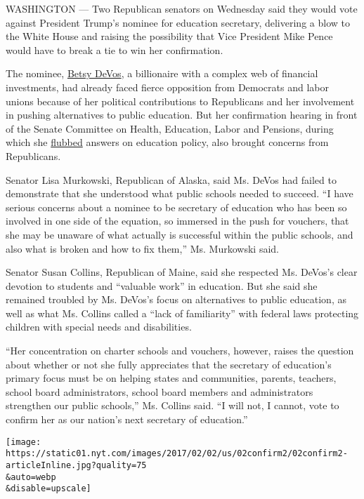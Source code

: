 WASHINGTON --- Two Republican senators on Wednesday said they would vote
against President Trump's nominee for education secretary, delivering a
blow to the White House and raising the possibility that Vice President
Mike Pence would have to break a tie to win her confirmation.

The nominee,
\href{https://www.nytimes.com/2017/01/18/us/politics/betsy-devos-education-secretary-confirmation-donald-trump.html}{Betsy
DeVos}, a billionaire with a complex web of financial investments, had
already faced fierce opposition from Democrats and labor unions because
of her political contributions to Republicans and her involvement in
pushing alternatives to public education. But her confirmation hearing
in front of the Senate Committee on Health, Education, Labor and
Pensions, during which she
\href{https://www.nytimes.com/2017/01/18/us/politics/betsy-devos-education-secretary-confirmation-donald-trump.html?_r=0}{flubbed}
answers on education policy, also brought concerns from Republicans.

Senator Lisa Murkowski, Republican of Alaska, said Ms. DeVos had failed
to demonstrate that she understood what public schools needed to
succeed. ``I have serious concerns about a nominee to be secretary of
education who has been so involved in one side of the equation, so
immersed in the push for vouchers, that she may be unaware of what
actually is successful within the public schools, and also what is
broken and how to fix them,'' Ms. Murkowski said.

Senator Susan Collins, Republican of Maine, said she respected Ms.
DeVos's clear devotion to students and ``valuable work'' in education.
But she said she remained troubled by Ms. DeVos's focus on alternatives
to public education, as well as what Ms. Collins called a ``lack of
familiarity'' with federal laws protecting children with special needs
and disabilities.

``Her concentration on charter schools and vouchers, however, raises the
question about whether or not she fully appreciates that the secretary
of education's primary focus must be on helping states and communities,
parents, teachers, school board administrators, school board members and
administrators strengthen our public schools,'' Ms. Collins said. ``I
will not, I cannot, vote to confirm her as our nation's next secretary
of education.''

\texttt{[image: https://static01.nyt.com/images/2017/02/02/us/02confirm2/02confirm2-articleInline.jpg?quality=75\\\&auto=webp\\\&disable=upscale]}

